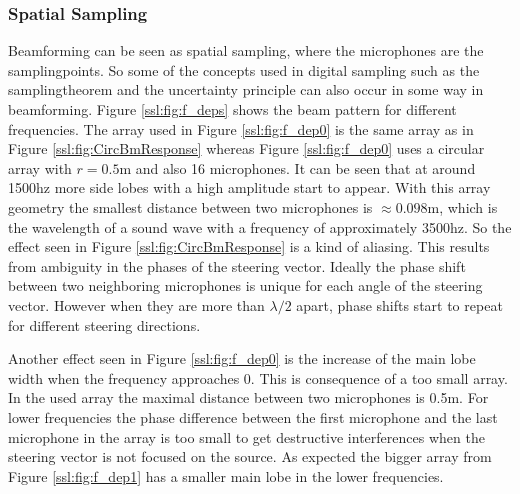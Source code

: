 \subsubsection{Spatial Sampling}
\label{sec:spatSam}
Beamforming can be seen as spatial sampling, where the microphones
are the samplingpoints.
So some of the concepts used in digital sampling such as
the samplingtheorem and the uncertainty principle can also
occur in some way in beamforming.
Figure \ref{ssl:fig:f_deps} shows the beam pattern for different frequencies.
The array used in Figure \ref{ssl:fig:f_dep0} is the same array
as in Figure \ref{ssl:fig:CircBmResponse} whereas Figure \ref{ssl:fig:f_dep0}
uses a circular array with $r = 0.5$m and also 16 microphones.
It can be seen that at around 1500hz more side lobes with a
high amplitude start to appear.
With this array geometry the smallest distance between two
microphones is $\approx 0.098$m, which is the wavelength
of a sound wave with a frequency of approximately 3500hz.
So the effect seen in Figure \ref{ssl:fig:CircBmResponse} is
a kind of aliasing.
This results from ambiguity in the phases of the steering vector.
Ideally the phase shift between two neighboring microphones is unique
for each angle of the steering vector.
However when they are more than $\lambda/2$ apart, phase shifts start to
repeat for different steering directions.

Another effect seen in Figure \ref{ssl:fig:f_dep0} is the increase
of the main lobe width when the frequency approaches 0.
This is consequence of a too small array.
In the used array the maximal distance between two microphones is 0.5m.
For lower frequencies the phase difference between the first microphone and
the last microphone in the array is too small to get destructive
interferences when the steering vector is not focused on the source.
As expected the bigger array from Figure \ref{ssl:fig:f_dep1} has a smaller
main lobe in the lower frequencies.

